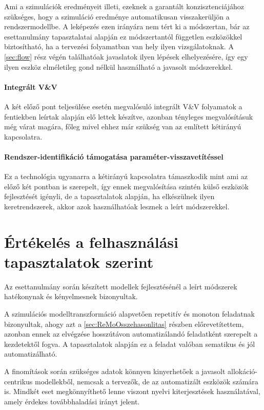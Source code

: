             Ami a szimulációk eredményeit illeti, ezeknek a garantált konzisztenciájához szükséges, hogy a szimuláció eredménye automatikusan visszakerüljön a rendszermodellbe.
            A leképezés ezen irányára nem tért ki a módszertan, bár az esettanulmány tapasztalatai alapján ez módszertantól független eszközökkel biztosítható, ha a tervezési folyamatban van hely ilyen vizsgálatoknak.
            A \ref{sec:flow} rész végén találhatóak javaslatok ilyen lépések elhelyezésére, így egy ilyen eszköz elméletileg gond nélkül használható a javasolt módszerekkel.

            \paragraph{Integrált V\&V}
            A két előző pont teljesülése esetén megvalósuló integrált V\&V folyamatok a fentiekben leírtak alapján elő lettek készítve, azonban tényleges megvalósításuk még várat magára, főleg mivel ehhez már szükség van az említett kétirányú kapcsolatra.
            
            \paragraph{Rendszer-identifikáció támogatása paraméter-visszavetítéssel}
            Ez a technológia ugyanarra a kétirányú kapcsolatra támaszkodik mint ami az előző két pontban is szerepelt, így ennek megvalósítása szintén külső eszközök fejlesztését igényli, de a tapasztalatok alapján, ha elkészülnek ilyen keretrendszerek, akkor azok használhatóak lesznek a leírt módszerekkel.

    \section{Értékelés a felhasználási tapasztalatok szerint}
    Az esettanulmány során készített modellek fejlesztésénél a leírt módszerek hatékonynak és kényelmesnek bizonyultak.
    
    A szimulációs modelltranszformáció alapvetően repetitív és monoton feladatnak bizonyultak, ahogy azt a \ref{sec:ReMoOsszehasonlitas} részben előrevetítettem, azonban ennek az elvégzése hosszútávon automatizálandó feladatként szerepelt a kezdetektől fogva.
    A tapasztalatok alapján ez a feladat valóban sematikus és jól automatizálható.
    
    A finomítások során szükséges adatok könnyen kinyerhetőek a javasolt allokáció-centrikus modellekből, nemcsak a tervezők, de az automatizált eszközök számára is. Mindkét eset megkönnyíthető lenne viszont nyelvi kiterjesztések használatával, amely érdekes továbbhaladási irányt jelent.